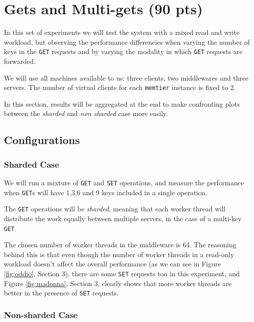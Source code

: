 \documentclass[11pt,a4paper]{article}
\renewcommand{\t}[1]{%
	{\texttt{#1}}}
\begin{document}
\section{Gets and Multi-gets (90 pts)}


In this set of experiments we will test the system with a mixed read and write workload, but observing the 
performance differencies when varying the number of keys in the \t{GET} requests and by varying the modality
in which \t{GET} requests are forwarded.

We will use all machines available to us: three clients, two middlewares and three servers.
The number of virtual clients for each \t{memtier} instance is fixed to 2.

In this section, results will be aggregated at the end to make confronting plots between the \emph{sharded}
and \emph{non sharded} case more easily.

\subsection{Configurations}


\subsubsection{Sharded Case}

We will run a mixture of \t{GET} and \t{SET} operations, and measure the performance 
when \t{GET}s will have 1,3,6 and 9 keys included in a single operation.

The \t{GET} operations will be \emph{sharded}, meaning that each worker thread will distribute the work
equally between multiple servers, in the case of a multi-key \t{GET}.

The chosen number of worker threads in the middleware is 64. The reasoning behind this is that even though
the number of worker threads in a read-only workload doesn't affect the overall performance (as we can see
in Figure \ref{fig:oddio}, Section 3), there are some \t{SET} requests too in this experiment, and Figure 
\ref{fig:madonna}, Section 3, clearly shows that more worker threads are better in the presence of 
\t{SET} requests.

\subsubsection{Non-sharded Case}
\end{document}
